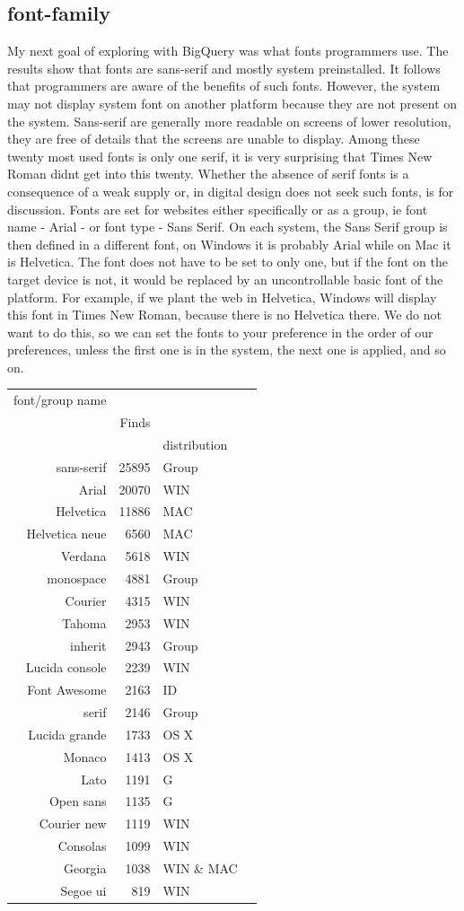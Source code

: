 \documentclass[a4paper]{article}
\begin{document}
\subsection{font-family}
My next goal of exploring with BigQuery was what fonts programmers use. The results show that fonts are sans-serif and mostly system preinstalled. It follows that programmers are aware of the benefits of such fonts. However, the system may not display system font on another platform because they are not present on the system. Sans-serif are generally more readable on screens of lower resolution, they are free of details that the screens are unable to display. Among these twenty most used fonts is only one serif, it is very surprising that Times New Roman didnt get into this twenty. Whether the absence of serif fonts is a consequence of a weak supply or, in digital design does not seek such fonts, is for discussion. Fonts are set for websites either specifically or as a group, ie font name - Arial - or font type - Sans Serif. On each system, the Sans Serif group is then defined in a different font, on Windows it is probably Arial while on Mac it is Helvetica. The font does not have to be set to only one, but if the font on the target device is not, it would be replaced by an uncontrollable basic font of the platform. For example, if we plant the web in Helvetica, Windows will display this font in Times New Roman, because there is no Helvetica there. We do not want to do this, so we can set the fonts to your preference in the order of our preferences, unless the first one is in the system, the next one is applied, and so on.

\begin{tabular}{r | rlr}
font/group name & \\
& Finds & \\
&& distribution & \\
\midrule
sans-serif & 25895 & Group \\
Arial & 20070 & WIN \\
Helvetica & 11886 & MAC \\
Helvetica neue & 6560 & MAC \\
Verdana & 5618 & WIN \\
monospace & 4881 & Group \\
Courier & 4315 & WIN \\
Tahoma & 2953 & WIN \\
inherit & 2943 & Group \\
Lucida console & 2239 & WIN \\
Font Awesome & 2163 & ID \\
serif & 2146 & Group \\
Lucida grande & 1733 & OS X \\
Monaco & 1413 & OS X \\
Lato & 1191 & G \\
Open sans & 1135 & G \\
Courier new & 1119 & WIN \\
Consolas & 1099 & WIN \\
Georgia & 1038 & WIN \& MAC \\
Segoe ui & 819 & WIN \\
\end{tabular}
\end{document}
